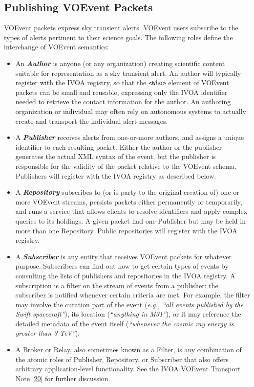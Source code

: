 \documentclass[11pt,a4paper]{ivoa}
\begin{document}
\subsection{Publishing VOEvent Packets}
\label{sec:2.1}
VOEvent packets express sky transient alerts. VOEvent users subscribe to the types of alerts pertinent to their science goals. The following roles define the interchange of VOEvent semantics: 
\begin{itemize}
\item An \emph{\bf Author} is anyone (or any organization) creating scientific content suitable for representation as a sky transient alert. An author will typically register with the IVOA registry, so that the {\tt <Who>} element of VOEvent packets can be small and reusable, expressing only the IVOA identifier needed to retrieve the contact information for the author. An authoring organization or individual may often rely on autonomous systems to actually create and transport the individual alert messages. 
\item A \emph{\bf Publisher} receives alerts from one-or-more authors, and assigns a unique identifier to each resulting packet. Either the author or the publisher generates the actual XML syntax of the event, but the publisher is responsible for the validity of the packet relative to the VOEvent schema. Publishers will register with the IVOA registry as described below. 
\item A \emph{\bf Repository} subscribes to (or is party to the original creation of) one or more VOEvent streams, persists packets either permanently or temporarily, and runs a service that allows clients to resolve identifiers and apply complex queries to its holdings. A given packet had one Publisher but may be held in more than one Repository. Public repositories will register with the IVOA registry. 
\item A \emph{\bf Subscriber} is any entity that receives VOEvent packets for whatever purpose. Subscribers can find out how to get certain types of events by consulting the lists of publishers and repositories in the IVOA registry. A subscription is a filter on the stream of events from a publisher: the subscriber is notified whenever certain criteria are met. For example, the filter may involve the curation part of the event (\emph{e.g., ``all events published by the Swift spacecraft''}), its location (\emph{``anything in M31''}), or it may reference the detailed metadata of the event itself (\emph{``whenever the cosmic ray energy is greater than 3 TeV''}). 
\item A Broker or Relay, also sometimes known as a Filter, is any combination of the atomic roles of Publisher, Repository, or Subscriber that also offers arbitrary application-level functionality. See the IVOA VOEvent Transport Note [\hyperref[bib20]{20}] for further discussion. 
\end{itemize}
\end{document}
